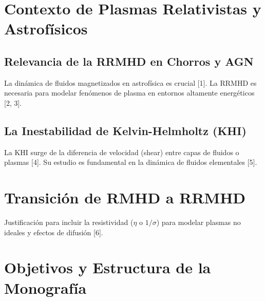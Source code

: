 \section{Contexto de Plasmas Relativistas y Astrofísicos}
    \subsection{Relevancia de la RRMHD en Chorros y AGN}
        La dinámica de fluidos magnetizados en astrofísica es crucial [1]. La RRMHD es necesaria para modelar fenómenos de plasma en entornos altamente energéticos [2, 3].
    \subsection{La Inestabilidad de Kelvin-Helmholtz (KHI)}
        La KHI surge de la diferencia de velocidad (shear) entre capas de fluidos o plasmas [4]. Su estudio es fundamental en la dinámica de fluidos elementales [5].

\section{Transición de RMHD a RRMHD}
    Justificación para incluir la resistividad ($\eta$ o $1/\sigma$) para modelar plasmas no ideales y efectos de difusión [6].

\section{Objetivos y Estructura de la Monografía}
